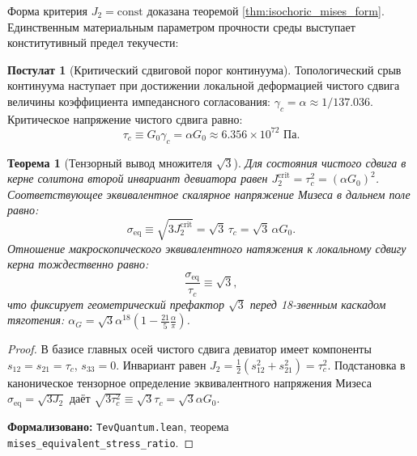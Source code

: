 \documentclass[11pt,a4paper]{article}
\newtheorem{theorem}{Теорема}
\theoremstyle{definition}
\newtheorem{postulate}{Постулат}
\theoremstyle{remark}
\begin{document}
Форма критерия $J_2 = \text{const}$ доказана теоремой \ref{thm:isochoric_mises_form}. Единственным материальным параметром прочности среды выступает конститутивный предел текучести:

\begin{postulate}[Критический сдвиговой порог континуума]
\label{post:shear_yield_threshold}
Топологический срыв континуума наступает при достижении локальной деформацией чистого сдвига величины коэффициента импедансного согласования: $\gamma_c = \alpha \approx 1/137.036$. Критическое напряжение чистого сдвига равно:
\begin{equation}
    \tau_c \equiv G_0 \gamma_c = \alpha G_0 \approx 6.356 \times 10^{72}\text{ Па}.
    \label{eq:critical_shear_stress_def}
\end{equation}
\end{postulate}

\begin{theorem}[Тензорный вывод множителя $\sqrt{3}$]
\label{thm:mises_equivalent_stress_root3}
Для состояния чистого сдвига в керне солитона второй инвариант девиатора равен $J_2^{\mathrm{crit}} = \tau_c^2 = (\alpha G_0)^2$. Соответствующее эквивалентное скалярное напряжение Мизеса в дальнем поле равно:
\begin{equation}
    \sigma_{\mathrm{eq}} \equiv \sqrt{3 J_2^{\mathrm{crit}}} = \sqrt{3} \, \tau_c = \sqrt{3} \, \alpha G_0.
    \label{eq:mises_equivalent_stress_exact}
\end{equation}
Отношение макроскопического эквивалентного натяжения к локальному сдвигу керна тождественно равно:
\begin{equation}
    \frac{\sigma_{\mathrm{eq}}}{\tau_c} \equiv \sqrt{3},
\end{equation}
что фиксирует геометрический префактор $\sqrt{3}$ перед 18-звенным каскадом тяготения: $\alpha_G = \sqrt{3} \alpha^{18} (1 - \frac{21}{5}\frac{\alpha}{\pi})$.
\end{theorem}
\begin{proof}
В базисе главных осей чистого сдвига девиатор имеет компоненты $s_{12} = s_{21} = \tau_c$, $s_{33} = 0$. Инвариант равен $J_2 = \frac{1}{2}(s_{12}^2 + s_{21}^2) = \tau_c^2$. Подстановка в каноническое тензорное определение эквивалентного напряжения Мизеса $\sigma_{\mathrm{eq}} = \sqrt{3 J_2}$ даёт $\sqrt{3 \tau_c^2} \equiv \sqrt{3}\tau_c = \sqrt{3}\alpha G_0$.

\noindent\small\textbf{Формализовано:} \texttt{TevQuantum.lean}, теорема \texttt{mises_equivalent_stress_ratio}.
\end{proof}
\end{document}
